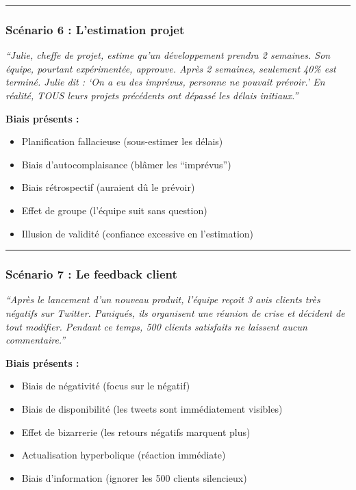 \documentclass[
]{article}
\providecommand{\tightlist}{%
  \setlength{\itemsep}{0pt}\setlength{\parskip}{0pt}}
\begin{document}
\begin{center}\rule{0.5\linewidth}{0.5pt}\end{center}

\subsubsection{Scénario 6 : L'estimation
projet}\label{scuxe9nario-6-lestimation-projet}

\emph{``Julie, cheffe de projet, estime qu'un développement prendra 2
semaines. Son équipe, pourtant expérimentée, approuve. Après 2 semaines,
seulement 40\% est terminé. Julie dit : `On a eu des imprévus, personne
ne pouvait prévoir.' En réalité, TOUS leurs projets précédents ont
dépassé les délais initiaux.''}

\textbf{Biais présents :}

\begin{itemize}
\tightlist
\item
  Planification fallacieuse (sous-estimer les délais)
\item
  Biais d'autocomplaisance (blâmer les ``imprévus'')
\item
  Biais rétrospectif (auraient dû le prévoir)
\item
  Effet de groupe (l'équipe suit sans question)
\item
  Illusion de validité (confiance excessive en l'estimation)
\end{itemize}

\begin{center}\rule{0.5\linewidth}{0.5pt}\end{center}

\subsubsection{Scénario 7 : Le feedback
client}\label{scuxe9nario-7-le-feedback-client}

\emph{``Après le lancement d'un nouveau produit, l'équipe reçoit 3 avis
clients très négatifs sur Twitter. Paniqués, ils organisent une réunion
de crise et décident de tout modifier. Pendant ce temps, 500 clients
satisfaits ne laissent aucun commentaire.''}

\textbf{Biais présents :}

\begin{itemize}
\tightlist
\item
  Biais de négativité (focus sur le négatif)
\item
  Biais de disponibilité (les tweets sont immédiatement visibles)
\item
  Effet de bizarrerie (les retours négatifs marquent plus)
\item
  Actualisation hyperbolique (réaction immédiate)
\item
  Biais d'information (ignorer les 500 clients silencieux)
\end{itemize}
\end{document}
